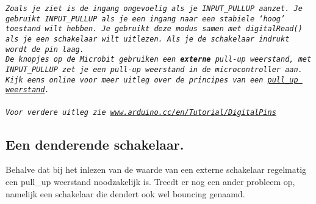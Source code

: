 \begin{comment}
	Wat zie je gebeuren? 
	\vspace{1cm}
	\hrule
	\vspace{0.8cm}
	Tussen welke waardes op de linker as liggen de meetwaardes? \hrulefill
	
	Hoeveel bits zijn nodig om dit getal (de hoogste waarde) weer te geven?  \hrulefill
	
	Voeg nu deze regel toe in het \textcolor{OliveGreen}{setup}() deel:
	
	\hspace{1cm}
	\textcolor{BurntOrange}{pinMode}(0,\textcolor{BlueGreen}{INPUT\_PULLUP});\\
	
	Sla je programma op met \colorbox{mygray}{\textbf{Ctrl + S}} en upload het programma met \colorbox{mygray}{\textbf{Ctrl + U}} , open de Seriële Plotter.
	
	Wat zie je nu gebeuren?
	\vspace{1cm}
	\hrule
	Tussen welke waardes op de linker as liggen de meetwaardes? \hrulefill
\end{comment}
\begin{minipage}{\linewidth}
	\footnotesize{\texttt{\textit{Zoals je ziet is de ingang ongevoelig als je \textcolor{arduinoBlue}{INPUT\_PULLUP} aanzet. Je gebruikt \textcolor{arduinoBlue}{INPUT\_PULLUP} als je een ingang naar een stabiele ‘hoog’ toestand wilt hebben. Je gebruikt deze modus samen met digitalRead() als je een schakelaar wilt uitlezen. Als je de schakelaar indrukt wordt de pin laag.\\
				De knopjes op de Microbit gebruiken een \textbf{externe} pull-up weerstand, met \textcolor{arduinoBlue}{INPUT\_PULLUP} zet je een pull-up weerstand in de microcontroller aan.\\ Kijk eens online voor meer uitleg over de principes van een  \href{https://www.freecodecamp.org/news/a-simple-explanation-of-pull-down-and-pull-up-resistors-660b308f116a/}{pull\_up weerstand}.\\ \\
				Voor verdere uitleg zie \href{https://www.arduino.cc/en/Tutorial/DigitalPins}{www.arduino.cc/en/Tutorial/DigitalPins}
	}}}
\end{minipage}
\normalsize
\subsection{Een denderende schakelaar.}

Behalve dat bij het inlezen van de waarde van een externe schakelaar regelmatig een pull\_up weerstand noodzakelijk is. 
Treedt er nog een ander probleem op, namelijk een schakelaar die dendert ook wel bouncing genaamd.

